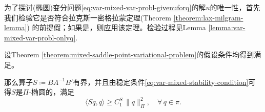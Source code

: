 为了探讨(椭圆)变分问题\eqref{eq:var-mixed-var-probl-givenuforq}的解$u$的唯一性，首先我们检验它是否符合拉克斯一密格拉蒙定理(Theorem \ref{theorem:lax-milgram-lemma}) 的前提假；如果是，则应用该定理。检验过程见Lemma \ref{lemma:var-mixed-var-probl-onlyq}.

\begin{lemma}
  \label{lemma:var-mixed-var-probl-onlyq}
  设Theorem \ref{theorem:mixed-saddle-point-variational-problem}的假设条件均得到满足。

  那么算子$S \coloneqq B A^{-1} B'$有界，并且由稳定条件\eqref{eq:var-mixed-stability-condition}可得$S$是$\Pi$-椭圆的，满足
  \begin{equation}
    \label{eq:var-mixed-var-prob-forq}
    \langle Sq, q \rangle \ge C_1^S \, \big\| q \big\|_{\Pi}^2, \quad \forall \, q \in \pi.
  \end{equation}
\end{lemma}

